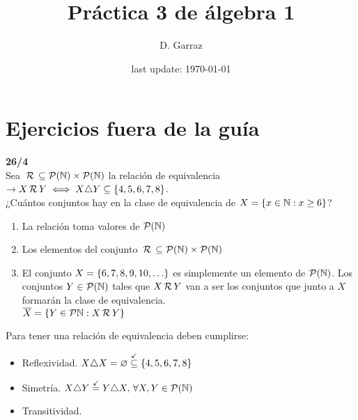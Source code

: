 \documentclass[12pt,a4paper, spanish]{article}
\begin{document}
\pagestyle{empty} %

\title{Práctica 3 de álgebra 1} %
\author{D. Garraz} %
\date{last update: \today} %
\section*{Ejercicios fuera de la guía}
\textbf{26/4}\\
Sea $\,\mathcal{R}\, \subseteq \mathcal P(\mathbb N) \times \mathcal P(\mathbb N)$ la relación de equivalencia
$\to X \,\mathcal{R}\, Y \iff X \triangle Y \subseteq \left\{ 4,5,6,7,8 \right\}$.\\
¿Cuántos conjuntos hay en la clase de equivalencia de $X = \left\{ x \in \mathbb N : x \geq 6 \right\}$?

\separadorCorto

\begin{enumerate}
	\item La relación toma valores de $\mathcal P(\mathbb N)$

	\item Los elementos del conjunto $\,\mathcal{R}\, \subseteq \mathcal P(\mathbb N) \times \mathcal P(\mathbb N)$

	\item El conjunto $X = \set{\foreach \i in {6,...,10}{\i, }\dots}$ es simplemente un elemento de $\mathcal P(\mathbb N)$.
	      Los conjuntos $Y \in \mathcal P(\mathbb N)$ tales que $X \,\mathcal{R}\, Y$ van a ser los conjuntos que junto a $X$ formarán la
	      clase de equivalencia.\\
	      $ \overline{X} = \left\{ Y \in \mathcal P{\mathbb N} : X \,\mathcal{R}\, Y \right\}$
\end{enumerate}

Para tener una relación de equivalencia deben cumplirse:
\begin{itemize}
	\item Reflexividad. $X \triangle X = \varnothing \stackrel{\checkmark}\subseteq \left\{ 4,5,6,7,8 \right\}$
	\item Simetría. $X \triangle Y \stackrel{\checkmark}= Y \triangle X,\, \forall X,Y \in \mathcal P(\mathbb N)$
	\item Transitividad.
\end{itemize}
\end{document}
